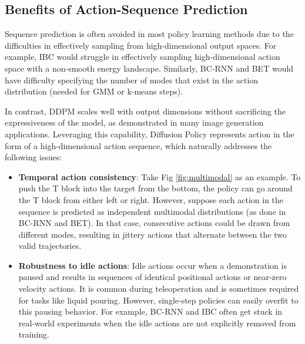 \subsection{Benefits of Action-Sequence Prediction}
\label{sec:action_sequence}



Sequence prediction is often avoided in most policy learning methods due to the difficulties in effectively sampling from high-dimensional output spaces. For example, IBC would struggle in effectively sampling high-dimensional action space with a non-smooth energy landscape. Similarly, BC-RNN and BET would have difficulty specifying the number of modes that exist in the action distribution (needed for GMM or k-means steps).

In contrast, DDPM scales well with output dimensions without sacrificing the expressiveness of the model, as demonstrated in many image generation applications. Leveraging this capability, Diffusion Policy represents action in the form of a high-dimensional action sequence, which naturally addresses the following issues:

\begin{itemize} [leftmargin=3mm]
    \item \textbf{Temporal action consistency}: Take Fig \ref{fig:multimodal} as an example. To push the T block into the target from the bottom, the policy can go around the T block from either left or right. However, suppose each action in the sequence is predicted as independent multimodal distributions (as done in BC-RNN and BET). In that case, consecutive actions could be drawn from different modes, resulting in jittery actions that alternate between the two valid trajectories.

    \item \textbf{Robustness to idle actions}: Idle actions occur when a demonstration is paused and results in sequences of identical positional actions or near-zero velocity actions. It is common during teleoperation and is sometimes required for tasks like liquid pouring. However, single-step policies can easily overfit to this pausing behavior. For example, BC-RNN and IBC often get stuck in real-world experiments when the idle actions are not explicitly removed from training.

\end{itemize}

